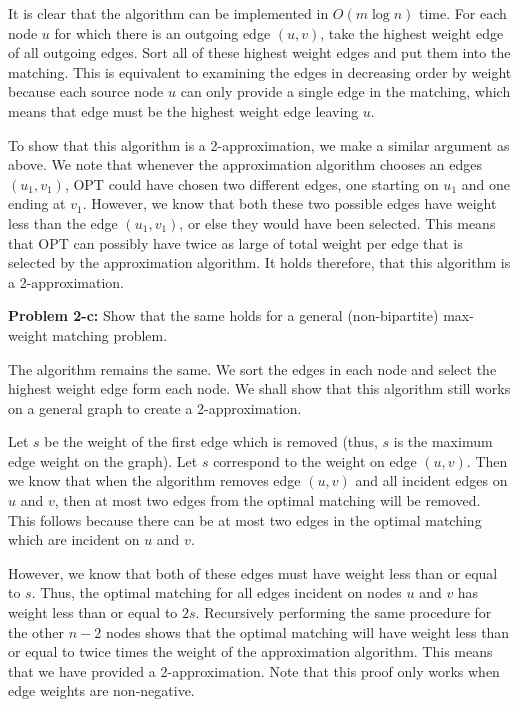 \documentclass[psamsfonts]{amsart}
\newenvironment{sol}{\vspace{0.25cm}{\large \bfseries Solution:}}{\qedsymbol}
\newenvironment{prob}[1]{\begin{framed}{\large \bfseries Problem #1:}}{\end{framed}}
\begin{document}
\begin{sol}
It is clear that the algorithm can be implemented in $O(m \log n)$ time. For each node $u$ for which there is an outgoing edge $(u,v)$, take the highest weight edge of all outgoing edges. Sort all of these highest weight edges and put them into the matching. This is equivalent to examining the edges in decreasing order by weight because each source node $u$ can only provide a single edge in the matching, which means that edge must be the highest weight edge leaving $u$.  

To show that this algorithm is a 2-approximation, we make a similar argument as above. We note that whenever the approximation algorithm chooses an edges $(u_1, v_1)$, OPT could have chosen two different edges, one starting on $u_1$ and one ending at $v_1$. However, we know that both these two possible edges have weight less than the edge $(u_1, v_1)$, or else they would have been selected. This means that OPT can possibly have twice as large of total weight per edge that is selected by the approximation algorithm. It holds therefore, that this algorithm is a 2-approximation.
\end{sol}

\begin{prob}{2-c}
Show that the same holds for a general (non-bipartite) max-weight matching problem.
\end{prob}
\begin{sol}
The algorithm remains the same. We sort the edges in each node and select the highest weight edge form each node. We shall show that this algorithm still works on a general graph to create a 2-approximation.

Let $s$ be the weight of the first edge which is removed (thus, $s$ is the maximum edge weight on the graph). Let $s$ correspond to the weight on edge $(u,v)$. Then we know that when the algorithm removes edge $(u,v)$ and all incident edges on $u$ and $v$, then at most two edges from the optimal matching will be removed. This follows because there can be at most two edges in the optimal matching which are incident on $u$ and $v$.

However, we know that both of these edges must have weight less than or equal to $s$. Thus, the optimal matching for all edges incident on nodes $u$ and $v$ has weight less than or equal to $2s$. Recursively performing the same procedure for the other $n-2$ nodes shows that the optimal matching will have weight less than or equal to twice times the weight of the approximation algorithm. This means that we have provided a 2-approximation. Note that this proof only works when edge weights are non-negative.
\end{sol}
\end{document}
